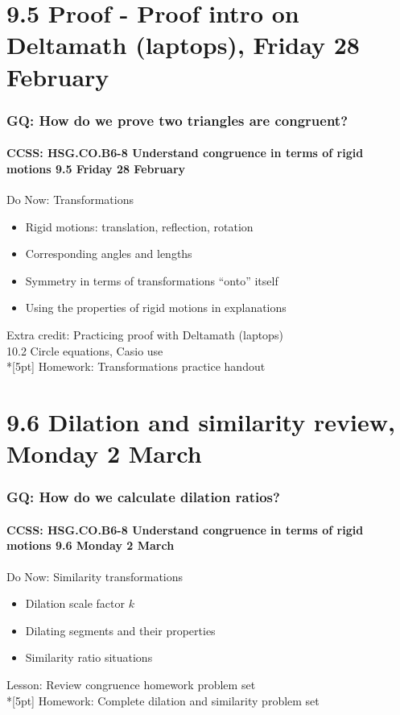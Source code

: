 \documentclass{beamer}
\begin{document}
\section{9.5 Proof - Proof intro on Deltamath (laptops), Friday 28 February}
\frame
{
  \frametitle{GQ: How do we prove two triangles are congruent?}
  \framesubtitle{CCSS: HSG.CO.B6-8 Understand congruence in terms of rigid motions \hfill \alert{9.5 Friday 28 February}}

  \begin{block}{Do Now: Transformations}
    \begin{itemize}
      \item Rigid motions: translation, reflection, rotation
      \item Corresponding angles and lengths
      \item Symmetry in terms of transformations ``onto'' itself
      \item Using the properties of rigid motions in explanations
    \end{itemize}
    \end{block}
    Extra credit: Practicing proof with Deltamath (laptops) \\
    10.2 Circle equations, Casio use\\*[5pt]
    Homework: Transformations practice handout
}

\section{9.6 Dilation and similarity review, Monday 2 March}
\frame
{
  \frametitle{GQ: How do we calculate dilation ratios?}
  \framesubtitle{CCSS: HSG.CO.B6-8 Understand congruence in terms of rigid motions \hfill \alert{9.6 Monday 2 March}}
  \begin{block}{Do Now: Similarity transformations}
    \begin{itemize}
      \item Dilation scale factor $k$
      \item Dilating segments and their properties
      \item Similarity ratio situations
    \end{itemize}
    \end{block}
    Lesson: Review congruence homework problem set \\*[5pt]
    Homework: Complete dilation and similarity problem set
}
\end{document}
